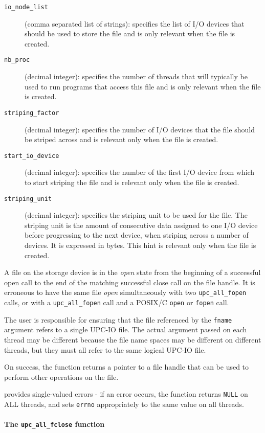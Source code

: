 \begin{description}
\item [{\tt io\_node\_list}] (comma separated list of strings): specifies the list of I/O
devices that should be used to store the file and is only relevant when the
file is created. 
\item [{\tt nb\_proc}] (decimal integer): specifies the number of threads that will typically be
used to run programs that access this file and is only relevant when the
file is created.
\item[{\tt striping\_factor}] (decimal integer): specifies the number of I/O devices that the
file should be striped across and is relevant only when the file is created.
\item[{\tt start\_io\_device}] (decimal integer): specifies the number of the first I/O device
from which to start striping the file and is relevant only when the file is
created.
\item[{\tt striping\_unit}] (decimal integer): specifies the striping unit to be used for the
file. The striping unit is the amount of consecutive data assigned to one
I/O device before progressing to the next device, when striping across a
number of devices. It is expressed in bytes. This hint is relevant only when
the file is created.
\end{description}

\np A file on the storage device is in the \textit{open} state from the
beginning of a successful open call to the end of the matching successful close call
on the file handle. It is
erroneous to have the same file \textit{open} simultaneously with two
{\tt upc\_all\_fopen} calls, or with a {\tt upc\_all\_fopen} call and a POSIX/C {\tt open} or
{\tt fopen} call.

\np The user is responsible for ensuring that the file referenced by the {\tt fname}
argument refers to a single UPC-IO file. The actual argument passed on each thread
may be different because the file name spaces may be different on different
threads, but they must all refer to the same logical UPC-IO file.

\np On success, the function returns a pointer to a file handle that can be
used to perform other operations on the file. 

 provides single-valued errors - if an error occurs, the
function returns {\tt NULL} on ALL threads, and sets {\tt errno} appropriately
to the same value on all threads.

\paragraph{The {\tt upc\_all\_fclose} function}

